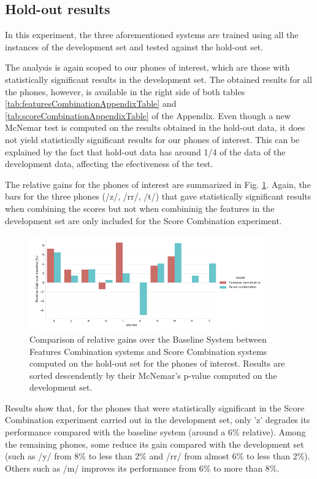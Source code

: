 \subsection{Hold-out results}

In this experiment, the three aforementioned systems are trained using all the instances of the
development set and tested against the hold-out set.

The analysis is again scoped to our phones of interest, which are those with statistically
significant results in the development set.
The obtained results for all the phones, however, is available
in the right side of both tables
\ref{tab:featuresCombinationAppendixTable} and \ref{tab:scoreCombinationAppendixTable}
of the Appendix.
Even though a new McNemar test is computed on the
results obtained in the hold-out data, it does not yield statistically significant results
for our phones of interest. This can be explained by the fact that hold-out data
has around 1/4 of the data of the
development data, affecting the efectiveness of the test.

The relative gains for the phones of interest are summarized in Fig. \ref{fig:fusionMcnemarTest}.
Again, the bars for the three phones (/z/, /rr/, /t/) that gave statistically significant
results when combining the scores but not when combininig the features in the development
set are only included for the Score Combination experiment.

\begin{figure}[H]
	\centering
	\includegraphics[width=0.9\textwidth]{files/figures/results/relatives/relative-fusion-systems-heldout-mcnemar.png}
	\caption{Comparison of relative gains over the Baseline System
	between Features Combination systems and Score Combination
	systems computed on the hold-out set for the phones of interest.
	Results are sorted descendently by their McNemar's p-value computed on the development set.}
	\label{fig:fusionMcnemarTest}
\end{figure}

Results show that, for the phones that were statistically significant in the Score Combination
experiment carried out in the development set, only 'z' degrades its performance compared
with the baseline system (around a 6\% relative). Among the
remaining phones, some reduce its gain compared with the development set (such as
/y/ from 8\% to less than 2\% and /rr/ from almost 6\% to less than 2\%). Others such
as /m/ improves its performance from 6\% to more than 8\%.

